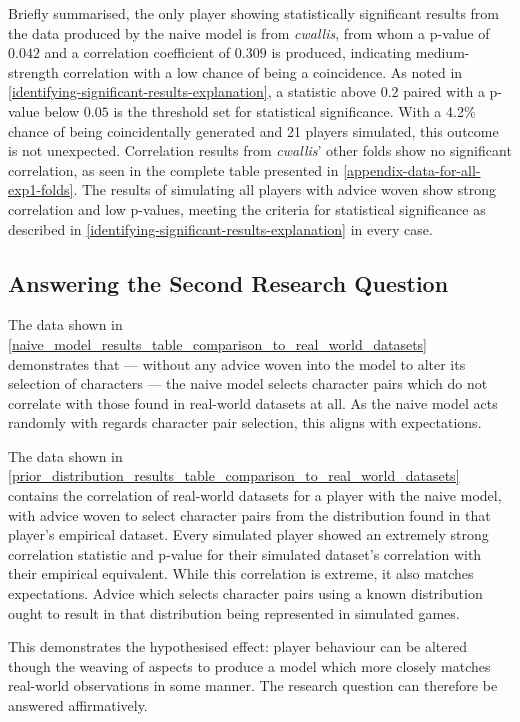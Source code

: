 Briefly summarised, the only player showing statistically significant results
from the data produced by the naive model is from \emph{cwallis}, from whom a
p-value of $0.042$ and a \tau{} correlation coefficient of $0.309$ is produced,
indicating medium-strength correlation with a low chance of being a coincidence.
As noted in \cref{identifying-significant-results-explanation}, a \tau{}
statistic above $0.2$ paired with a p-value below $0.05$ is the threshold set
for statistical significance. With a 4.2\% chance of being coincidentally
generated and 21 players simulated, this outcome is not unexpected. Correlation
results from \emph{cwallis}' other folds show no significant correlation, as
seen in the complete table presented in \cref{appendix-data-for-all-exp1-folds}.
The results of simulating all players with advice woven show strong correlation
and low p-values, meeting the criteria for statistical significance as described
in \cref{identifying-significant-results-explanation} in every case.


\subsection{Answering the Second Research Question}

The data shown in
\cref{naive_model_results_table_comparison_to_real_world_datasets} demonstrates
that --- without any advice woven into the model to alter its selection of
characters --- the naive model selects character pairs which do not correlate
with those found in real-world datasets at all. As the naive model acts randomly
with regards character pair selection, this aligns with expectations.

The data shown in
\cref{prior_distribution_results_table_comparison_to_real_world_datasets}
contains the correlation of real-world datasets for a player with the naive
model, with advice woven to select character pairs from the distribution found
in that player's empirical dataset. Every simulated player showed an
extremely strong correlation statistic and p-value for their simulated dataset's
correlation with their empirical equivalent. While this correlation is extreme,
it also matches expectations. Advice which selects character pairs using a known
distribution ought to result in that distribution being represented in
simulated games.

This demonstrates the hypothesised effect: player behaviour can be altered
though the weaving of aspects to produce a model which more closely matches
real-world observations in some manner. The research question can therefore be
answered affirmatively.

